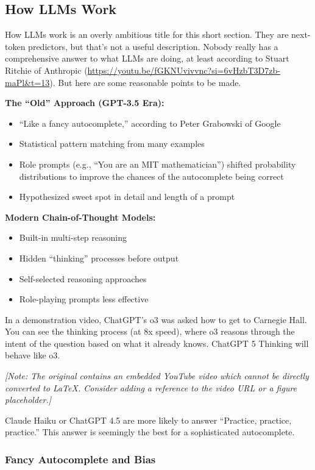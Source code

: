 \subsection{How LLMs Work}

How LLMs work is an overly ambitious title for this short section. They are next-token predictors, but that's not a useful description. Nobody really has a comprehensive answer to what LLMs are doing, at least according to Stuart Ritchie of Anthropic (\url{https://youtu.be/fGKNUvivvnc?si=6vHzbT3D7zb-maPl&t=13}). But here are some reasonable points to be made.

\textbf{The ``Old'' Approach (GPT-3.5 Era):}
\begin{itemize}
\item ``Like a fancy autocomplete,'' according to Peter Grabowski of Google
\item Statistical pattern matching from many examples
\item Role prompts (e.g., ``You are an MIT mathematician'') shifted probability distributions to improve the chances of the autocomplete being correct
\item Hypothesized sweet spot in detail and length of a prompt
\end{itemize}

\textbf{Modern Chain-of-Thought Models:}
\begin{itemize}
\item Built-in multi-step reasoning
\item Hidden ``thinking'' processes before output
\item Self-selected reasoning approaches
\item Role-playing prompts less effective
\end{itemize}

In a demonstration video, ChatGPT's o3 was asked how to get to Carnegie Hall. You can see the thinking process (at 8x speed), where o3 reasons through the intent of the question based on what it already knows. ChatGPT 5 Thinking will behave like o3.

\textit{[Note: The original contains an embedded YouTube video which cannot be directly converted to LaTeX. Consider adding a reference to the video URL or a figure placeholder.]}

Claude Haiku or ChatGPT 4.5 are more likely to answer ``Practice, practice, practice.'' This answer is seemingly the best for a sophisticated autocomplete.

\subsubsection{Fancy Autocomplete and Bias}

